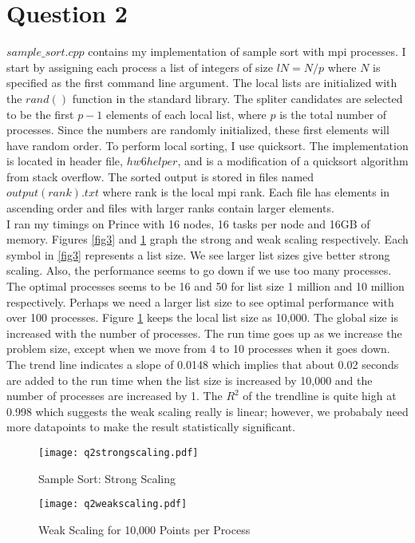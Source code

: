 \documentclass[10pt]{article}
\begin{document}
\lipsum

\newpage

\section{Question 2}

$sample\_sort.cpp$ contains my implementation of sample sort with mpi processes. I start by assigning each process a list of integers of size  $lN = N/p$ where $N$ is specified as the first command line argument. The local lists are initialized with the $rand()$ function in the standard library. The spliter candidates are selected to be the first $p-1$ elements of each local list, where $p$ is the total number of processes. Since the numbers are randomly initialized, these first elements will have random order. To perform local sorting, I use quicksort. The implementation is located in header file, $hw6helper$, and is a modification of a quicksort algorithm from stack overflow. The sorted output is stored in files named $output(rank).txt$ where rank is the local mpi rank. Each file has elements in ascending order and files with larger ranks contain larger elements.\\

I ran my timings on Prince with 16 nodes, 16 tasks per node and 16GB of memory. Figures \ref{fig3} and \ref{fig4} graph the strong and weak scaling respectively. Each symbol in \ref{fig3} represents a list size. We see larger list sizes give better strong scaling. Also, the performance seems to go down if we use too many processes. The optimal processes seems to be 16 and 50 for list size 1 million and 10 million respectively. Perhaps we need a larger list size to see optimal performance with over 100 processes. Figure \ref{fig4} keeps the local list size as 10,000. The global size is increased with the number of processes. The run time goes up as we increase the problem size, except when we move from 4 to 10 processes when it goes down. The trend line indicates a slope of 0.0148 which implies that about 0.02 seconds are added to the run time when the list size is increased by 10,000 and the number of processes are increased by 1. The $R^2$ of the trendline is quite high at 0.998 which suggests the weak scaling really is linear; however, we probabaly need more datapoints to make the result statistically significant.

\lipsum

\begin{figure}[!h]
    \centering
    \begin{minipage}{0.45\textwidth}
        \centering
        \texttt{[image: q2strongscaling.pdf]} %
        \caption{Sample Sort: Strong Scaling}
        \label{fig3}
    \end{minipage}\hfill
         \begin{minipage}{0.45\textwidth}
        \centering
        \texttt{[image: q2weakscaling.pdf]} %
        \caption{Weak Scaling for 10,000 Points per Process}
        \label{fig4}
    \end{minipage}
\end{figure}

\lipsum
\end{document}

